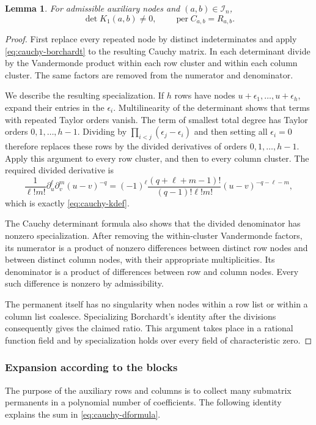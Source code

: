 \documentclass[11pt,reqno]{amsart}
\newtheorem{lemma}[theorem]{Lemma}
\theoremstyle{remark}
\numberwithin{equation}{section}
\newcommand{\per}{\operatorname{per}}
\newcommand{\calI}{\mathcal I}
\begin{document}
\begin{lemma}\label{lem:cauchy-confluent}
For admissible auxiliary nodes and $(a,b)\in\calI_n$,
\[
 \det K_1(a,b)\ne0,\qquad \per C_{a,b}=R_{a,b}.
\]
\end{lemma}

\begin{proof}
First replace every repeated node by distinct indeterminates and
apply \eqref{eq:cauchy-borchardt} to the resulting Cauchy matrix.
In each determinant divide by the Vandermonde product within each
row cluster and within each column cluster. The same factors are
removed from the numerator and denominator.

We describe the resulting specialization. If $h$ rows have nodes
$u+\epsilon_1,\ldots,u+\epsilon_h$, expand their entries in the
$\epsilon_i$. Multilinearity of the determinant shows that terms
with repeated Taylor orders vanish. The term of smallest total
degree has Taylor orders $0,1,\ldots,h-1$. Dividing by
$\prod_{i<j}(\epsilon_j-\epsilon_i)$ and then setting all
$\epsilon_i=0$ therefore replaces these rows by the divided
derivatives of orders $0,1,\ldots,h-1$. Apply this argument to
every row cluster, and then to every column cluster.
The required divided derivative is
\[
 \frac1{\ell!m!}\partial_u^\ell\partial_v^m(u-v)^{-q}
 =(-1)^\ell\frac{(q+\ell+m-1)!}{(q-1)!\ell!m!}
 (u-v)^{-q-\ell-m},
\]
which is exactly \eqref{eq:cauchy-kdef}.

The Cauchy determinant formula also shows that the divided
denominator has nonzero specialization. After removing the
within-cluster Vandermonde factors, its numerator is a product of
nonzero differences between distinct row nodes and between distinct
column nodes, with their appropriate multiplicities. Its denominator
is a product of differences between row and column nodes. Every such
difference is nonzero by admissibility.

The permanent itself has no singularity when nodes within a row
list or within a column list coalesce. Specializing Borchardt's
identity after the divisions consequently gives the claimed ratio.
This argument takes place in a rational function field and by
specialization holds over every field of characteristic zero.
\end{proof}

\subsubsection{Expansion according to the blocks}
The purpose of the auxiliary rows and columns is to collect many
submatrix permanents in a polynomial number of coefficients.
The following identity explains the sum in \eqref{eq:cauchy-dformula}.
\end{document}
